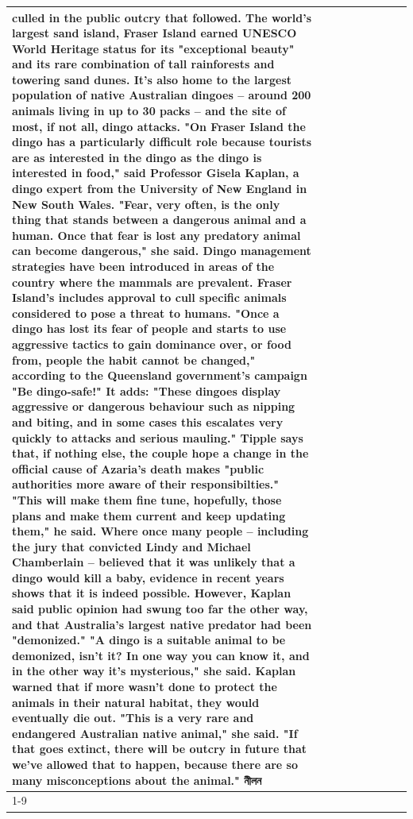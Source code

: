 \begin{table}[H]
\begin{tabular}{lllrlllll}
culled in the public outcry that followed. The world's largest sand island, Fraser Island earned UNESCO World Heritage status for its "exceptional beauty" and its rare combination of tall rainforests and towering sand dunes. It's also home to the largest population of native Australian dingoes -- around 200 animals living in up to 30 packs -- and the site of most, if not all, dingo attacks. "On Fraser Island the dingo has a particularly difficult role because tourists are as interested in the dingo as the dingo is interested in food," said Professor Gisela Kaplan, a dingo expert from the University of New England in New South Wales. "Fear, very often, is the only thing that stands between a dangerous animal and a human. Once that fear is lost any predatory animal can become dangerous," she said. Dingo management strategies have been introduced in areas of the country where the mammals are prevalent. Fraser Island's includes approval to cull specific animals considered to pose a threat to humans. "Once a dingo has lost its fear of people and starts to use aggressive tactics to gain dominance over, or food from, people the habit cannot be changed," according to the Queensland government's campaign "Be dingo-safe!" It adds: "These dingoes display aggressive or dangerous behaviour such as nipping and biting, and in some cases this escalates very quickly to attacks and serious mauling." Tipple says that, if nothing else, the couple hope a change in the official cause of Azaria's death makes "public authorities more aware of their responsibilties." "This will make them fine tune, hopefully, those plans and make them current and keep updating them," he said. Where once many people -- including the jury that convicted Lindy and Michael Chamberlain -- believed that it was unlikely that a dingo would kill a baby, evidence in recent years shows that it is indeed possible. However, Kaplan said public opinion had swung too far the other way, and that Australia's largest native predator had been "demonized." "A dingo is a suitable animal to be demonized, isn't it? In one way you can know it, and in the other way it's mysterious," she said. Kaplan warned that if more wasn't done to protect the animals in their natural habitat, they would eventually die out. "This is a very rare and endangered Australian native animal," she said. "If that goes extinct, there will be outcry in future that we've allowed that to happen, because there are so many misconceptions about the animal." নীলন \\
\cline{1-9}

\end{tabular}
\end{table}

